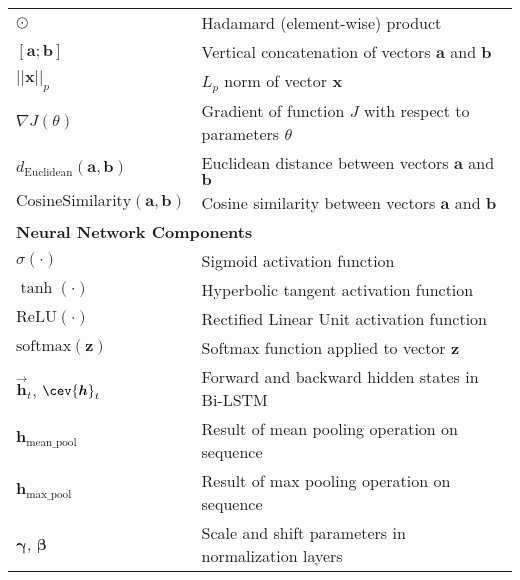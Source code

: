 \begin{appendices}
\begin{table}[htbp]
{\begin{tabular}{p{}p{}}
        \midrule
        $\odot$                                     & Hadamard (element-wise) product                                                      \\
        $[\bm{a};\bm{b}]$                           & Vertical concatenation of vectors $\bm{a}$ and $\bm{b}$                              \\
        $||\bm{x}||_p$                              & $L_p$ norm of vector $\bm{x}$                                                        \\
        $\nabla J(\theta)$                          & Gradient of function $J$ with respect to parameters $\theta$                         \\
        $d_{\text{Euclidean}}(\bm{a},\bm{b})$       & Euclidean distance between vectors $\bm{a}$ and $\bm{b}$                             \\
        $\text{CosineSimilarity}(\bm{a},\bm{b})$    & Cosine similarity between vectors $\bm{a}$ and $\bm{b}$                              \\
        \midrule
        \multicolumn{2}{l}{\textbf{Neural Network Components}}                                                                             \\
        \midrule
        $\sigma(\cdot)$                             & Sigmoid activation function                                                          \\
        $\tanh(\cdot)$                              & Hyperbolic tangent activation function                                               \\
        $\text{ReLU}(\cdot)$                        & Rectified Linear Unit activation function                                            \\
        $\text{softmax}(\bm{z})$                    & Softmax function applied to vector $\bm{z}$                                          \\
        $\vec{\bm{h}}_t$, $\cev{\bm{h}}_t$          & Forward and backward hidden states in Bi-LSTM                                        \\
        $\bm{h}_{\text{mean\_pool}}$                & Result of mean pooling operation on sequence                                         \\
        $\bm{h}_{\text{max\_pool}}$                 & Result of max pooling operation on sequence                                          \\
        $\bm{\gamma}$, $\bm{\beta}$                 & Scale and shift parameters in normalization layers                                   \\

\end{tabular}}
\end{table}
\end{appendices}
